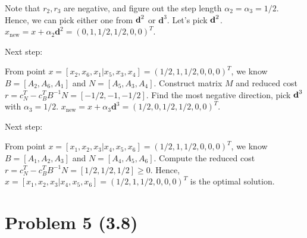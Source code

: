 \documentclass[12pt]{article}
\begin{document}
Note that $r_2, r_3$ are negative, and figure out the step length $\alpha_2 = \alpha_3 = 1/2$. Hence, we can pick either one from $\textbf d^2$ or $\textbf{d}^3$. Let's pick $\textbf d^2$. $x_{\text{new}} = x + \alpha_2\textbf{d}^2 = (0,1,1/2,1/2,0,0)^T$. 

Next step:

From point $x = [x_2, x_6, x_1 | x_5, x_3, x_4] = (1/2,1,1/2,0,0,0)^T$, we know $B = [A_2, A_6, A_1]$ and $N = [A_5, A_3, A_4]$. Construct matrix $M$ and reduced cost $r = c_N^T - c_B^TB^{-1}N = [-1/2, -1, -1/2]$. Find the most negative direction, pick $\textbf d^3$ with $\alpha_3 = 1/2$. $x_{\text{new}} = x + \alpha_3\textbf{d}^3 =  (1/2,0,1/2,1/2,0,0)^T$.

Next step:

From point $x = [x_1, x_2, x_3 | x_4, x_5, x_6] = (1/2,1,1/2,0,0,0)^T$, we know $B = [A_1, A_2, A_3]$ and $N = [A_4, A_5, A_6]$. Compute the reduced cost $r = c_N^T - c_B^TB^{-1}N = [1/2, 1/2, 1/2]  \geqslant 0$. Hence, $x = [x_1, x_2, x_3 | x_4, x_5, x_6] = (1/2,1,1/2,0,0,0)^T$ is the optimal solution.



\section*{Problem 5 (3.8)}
\end{document}
